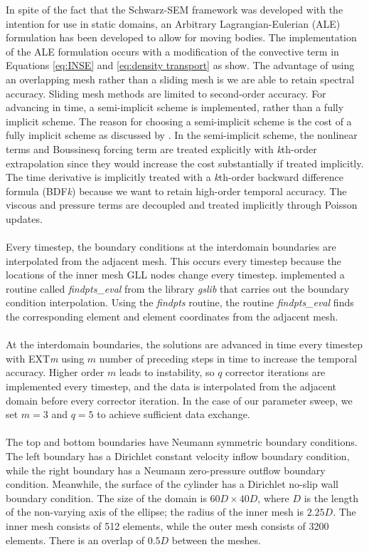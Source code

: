 In spite of the fact that the Schwarz-SEM framework was developed with the intention for use in static domains, an Arbitrary Lagrangian-Eulerian (ALE) formulation has been developed to allow for moving bodies. The implementation of the ALE formulation occurs with a modification of the convective term in Equations \ref{eq:INSE} and \ref{eq:density transport} as \cite{merrill_moving_2019} show. The advantage of using an overlapping mesh rather than a sliding mesh is we are able to retain spectral accuracy. Sliding mesh methods are limited to second-order accuracy.
For advancing in time, a semi-implicit scheme is implemented, rather than a fully implicit scheme. The reason for choosing a semi-implicit scheme is the cost of a fully implicit scheme as discussed by \cite{tomboulides_numerical_1997}. In the semi-implicit scheme, the nonlinear terms and Boussinesq forcing term are treated explicitly with \textit{k}th-order extrapolation since they would increase the cost substantially if treated implicitly. The time derivative is implicitly treated with a \textit{k}th-order backward difference formula (BDF\textit{k}) because we want to retain high-order temporal accuracy. The viscous and pressure terms are decoupled and treated implicitly through Poisson updates.\\\\
Every timestep, the boundary conditions at the interdomain boundaries are interpolated from the adjacent mesh. This occurs every timestep because the locations of the inner mesh GLL nodes change every timestep. \cite{mittal_nonconforming_2019} implemented a routine called \textit{findpts\_eval} from the library \textit{gslib} that carries out the boundary condition interpolation. Using the \textit{findpts} routine, the routine \textit{findpts\_eval} finds the corresponding element and element coordinates from the adjacent mesh.\\\\
At the interdomain boundaries, the solutions are advanced in time every timestep with EXT\textit{m} using $m$ number of preceding steps in time to increase the temporal accuracy. Higher order $m$ leads to instability, so $q$ corrector iterations are implemented every timestep, and the data is interpolated from the adjacent domain before every corrector iteration. In the case of our parameter sweep, we set $m=3$ and $q=5$ to achieve sufficient data exchange. \\\\  
The top and bottom boundaries have Neumann symmetric boundary conditions. The left boundary has a Dirichlet constant velocity inflow boundary condition, while the right boundary has a Neumann zero-pressure outflow boundary condition. Meanwhile, the surface of the cylinder has a Dirichlet no-slip wall boundary condition. The size of the domain is $60D \times 40D$, where $D$ is the length of the non-varying axis of the ellipse; the radius of the inner mesh is $2.25D$. The inner mesh consists of 512 elements, while the outer mesh consists of 3200 elements. There is an overlap of $0.5D$ between the meshes. 

